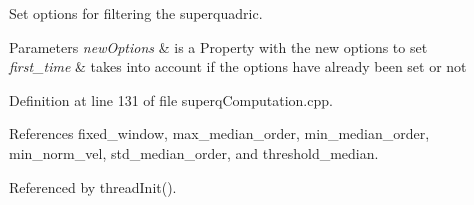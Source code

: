 Set options for filtering the superquadric. 


\begin{DoxyParams}{Parameters}
{\em new\+Options} & is a Property with the new options to set \\
\hline
{\em first\+\_\+time} & takes into account if the options have already been set or not \\
\hline
\end{DoxyParams}


Definition at line 131 of file superq\+Computation.\+cpp.



References fixed\+\_\+window, max\+\_\+median\+\_\+order, min\+\_\+median\+\_\+order, min\+\_\+norm\+\_\+vel, std\+\_\+median\+\_\+order, and threshold\+\_\+median.



Referenced by thread\+Init().


